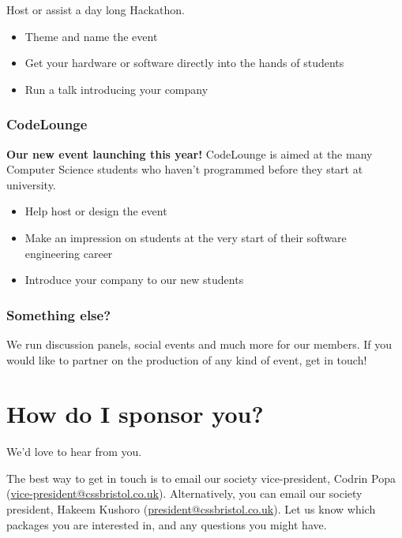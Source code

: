 \documentclass[]{article}
\begin{document}
Host or assist a day long Hackathon.

\begin{itemize}
	\item Theme and name the event
    \item Get your hardware or software directly into the hands of students
    \item Run a talk introducing your company
\end{itemize}

\subsubsection*{CodeLounge}

\textbf{Our new event launching this year!} CodeLounge is aimed at the many Computer Science students who haven't programmed before they start at university. 

\begin{itemize}
	\item Help host or design the event
    \item Make an impression on students at the very start of their software engineering career
    \item Introduce your company to our new students
\end{itemize}

\subsubsection*{Something else?}

We run discussion panels, social events and much more for our members. If you would like to partner on the production of any kind of event, get in touch!

\section*{How do I sponsor you?}

We'd love to hear from you.

The best way to get in touch is to email our society vice-president, Codrin Popa (\href{mailto:vice-president@cssbristol.co.uk}{vice-president@cssbristol.co.uk}). Alternatively, you can email our society president, Hakeem Kushoro (\href{mailto:president@cssbristol.co.uk}{president@cssbristol.co.uk}). Let us know which packages you are interested in, and any questions you might have.

\restoregeometry
\end{document}
